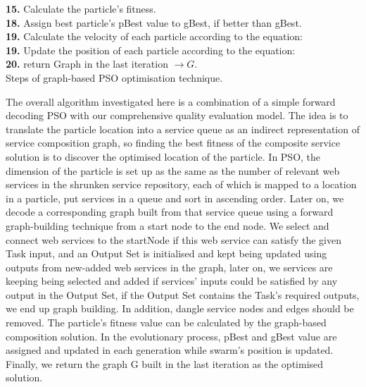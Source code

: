 \documentclass{llncs}
\begin{document}
\begin{algorithm}[!htb]
{{			\textbf{15.} Calculate the particle's fitness.\\
		}
		\textbf{18.} Assign best particle's pBest value to gBest, if better than gBest.\\
		\textbf{19.} Calculate the velocity of each particle according to the equation:\\
		\textbf{19.} Update the position of each particle according to the equation:\\
	}
		\textbf{20.} return Graph in the last iteration $ \rightarrow G$.\\
	
 \caption{Steps of graph-based PSO optimisation technique.}
\label{psoSteps}
\end{algorithm}
The overall algorithm investigated here is a combination of a simple forward decoding PSO \cite{da2016particle} with our comprehensive quality evaluation model. The idea is to translate the particle location into a service queue as an indirect representation of service composition graph, so finding the best fitness of the composite service solution is to discover the optimised location of the particle. In PSO, the dimension of the particle is set up as the same as the number of relevant web services in the shrunken service repository, each of which is mapped to a location in a particle, put services in a queue and sort in ascending order. Later on, we decode a corresponding graph built from that service queue using a forward graph-building technique from a start node to the end node. We select and connect web services to the startNode if this web service can satisfy the given Task input, and an Output Set is initialised and kept being updated using outputs from new-added web services in the graph, later on, we services are keeping being selected and added if services' inputs could be satisfied by any output in the Output Set, if the Output Set contains the Task's required outputs, we end up graph building. In addition, dangle service nodes and edges should be removed. The particle's fitness value can be calculated by the graph-based composition solution. In the evolutionary process, pBest and gBest value are assigned and updated in each generation while swarm's position is updated. Finally, we return the graph G built in the last iteration as the optimised solution.
\end{document}
